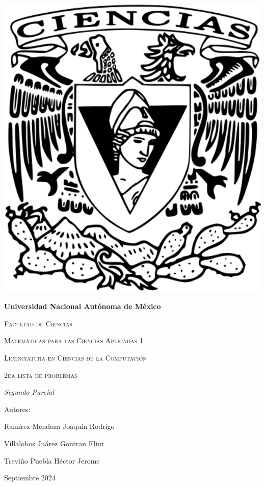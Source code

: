 \documentclass[oneside]{book}
\begin{document}
\begin{titlepage}
\begin{minipage}{10cm}
	\end{minipage}\hfill
	\begin{minipage}{3cm}
		\begin{center}
			\includegraphics[height = 0.14\textheight]{recursos/Logo_FC.png}\par
		\end{center}
	\end{minipage}
	\centering
	\vspace{1cm}

	{\bfseries\LARGE Universidad Nacional Autónoma de México \par}

	\vspace{1cm}
	{\scshape\Large Facultad de Ciencias \par}
	\vspace{1cm}
	{\scshape\Large Matemáticas para las Ciencias Aplicadas 1 \par}
	\vspace{1cm}
	{\scshape\Large Licenciatura en Ciencias de la Computación \par}
	\vspace{1cm}
	{\scshape\Huge 2da lista de problemas  \par}
	\vspace{3cm}
	{\itshape\Large Segundo Parcial \par}
	\vfill
	{\Large Autores: \par}
	{\Large Ramírez Mendoza Joaquín Rodrigo \par}
	{\Large Villalobos Juárez Gontran Eliut\par}
	{\Large Treviño Puebla Héctor Jerome \par}
	\vfill
	{\Large Septiembre 2024 \par}
\end{titlepage}
\end{document}
